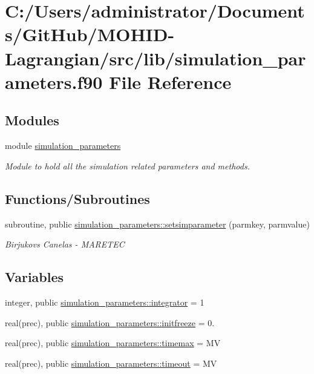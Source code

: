 \hypertarget{simulation__parameters_8f90}{}\section{C\+:/\+Users/administrator/\+Documents/\+Git\+Hub/\+M\+O\+H\+I\+D-\/\+Lagrangian/src/lib/simulation\+\_\+parameters.f90 File Reference}
\label{simulation__parameters_8f90}
\subsection*{Modules}
\begin{DoxyCompactItemize}
\item 
module \mbox{\hyperlink{namespacesimulation__parameters}{simulation\+\_\+parameters}}
\begin{DoxyCompactList}\small\item\em Module to hold all the simulation related parameters and methods. \end{DoxyCompactList}\end{DoxyCompactItemize}
\subsection*{Functions/\+Subroutines}
\begin{DoxyCompactItemize}
\item 
subroutine, public \mbox{\hyperlink{namespacesimulation__parameters_af905a4701f68f0ad0a50606101fda7d6}{simulation\+\_\+parameters\+::setsimparameter}} (parmkey, parmvalue)
\begin{DoxyCompactList}\small\item\em Birjukovs Canelas -\/ M\+A\+R\+E\+T\+EC \end{DoxyCompactList}\end{DoxyCompactItemize}
\subsection*{Variables}
\begin{DoxyCompactItemize}
\item 
integer, public \mbox{\hyperlink{namespacesimulation__parameters_a0a398ad974eef004e43a347105e8ad81}{simulation\+\_\+parameters\+::integrator}} = 1
\item 
real(prec), public \mbox{\hyperlink{namespacesimulation__parameters_add65346bea9045d3ea4573be190f7cdc}{simulation\+\_\+parameters\+::initfreeze}} = 0.
\item 
real(prec), public \mbox{\hyperlink{namespacesimulation__parameters_aedd90d7d1a6db61fcac836ac37034e75}{simulation\+\_\+parameters\+::timemax}} = MV
\item 
real(prec), public \mbox{\hyperlink{namespacesimulation__parameters_a70ee14718c33544ce34bf7990211e5cc}{simulation\+\_\+parameters\+::timeout}} = MV
\end{DoxyCompactItemize}
